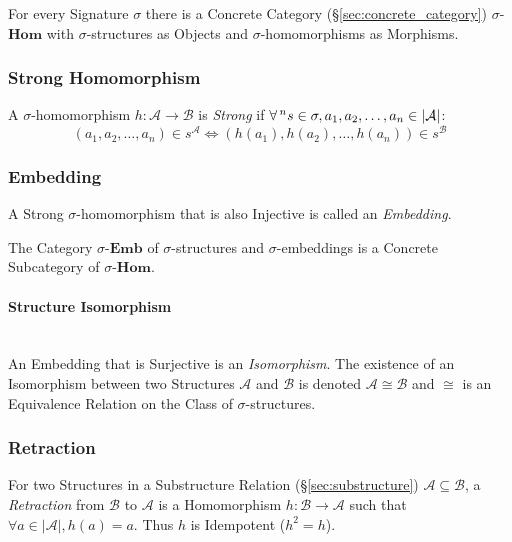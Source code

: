 For every Signature $\sigma$ there is a Concrete Category
(\S\ref{sec:concrete_category}) $\sigma$-$\mathbf{Hom}$ with
$\sigma$-structures as Objects and $\sigma$-homomorphisms as
Morphisms.



\subsubsection{Strong Homomorphism}\label{sec:strong_homomorphism}

A $\sigma$-homomorphism $h : \mathcal{A} \rightarrow \mathcal{B}$ is
\emph{Strong} if $\forall \prescript{n}{}{s} \in \sigma, a_1,
a_2,\ldots, a_n \in |\mathcal{A}|$:
\[
    (a_1, a_2,\ldots, a_n) \in s^\mathcal{A} \Leftrightarrow
    (h(a_1), h(a_2),\ldots,h(a_n)) \in s^\mathcal{B}
\]



\subsubsection{Embedding}\label{sec:embedding}

A Strong $\sigma$-homomorphism that is also Injective is called an
\emph{Embedding}.

The Category $\sigma$-$\mathbf{Emb}$ of $\sigma$-structures and
$\sigma$-embeddings is a Concrete Subcategory of
$\sigma$-$\mathbf{Hom}$.



\paragraph{Structure Isomorphism}\label{sec:structure_isomorphism}
\hfill \\

An Embedding that is Surjective is an \emph{Isomorphism}. The
existence of an Isomorphism between two Structures $\mathcal{A}$ and
$\mathcal{B}$ is denoted $\mathcal{A} \cong \mathcal{B}$ and $\cong$
is an Equivalence Relation on the Class of $\sigma$-structures.



\subsubsection{Retraction}\label{sec:retraction}

For two Structures in a Substructure Relation
(\S\ref{sec:substructure}) $\mathcal{A} \subseteq \mathcal{B}$, a
\emph{Retraction} from $\mathcal{B}$ to $\mathcal{A}$ is a
Homomorphism $h : \mathcal{B} \rightarrow \mathcal{A}$ such that
$\forall a \in |\mathcal{A}|, h(a) = a$. Thus $h$ is Idempotent ($h^2
= h$).

